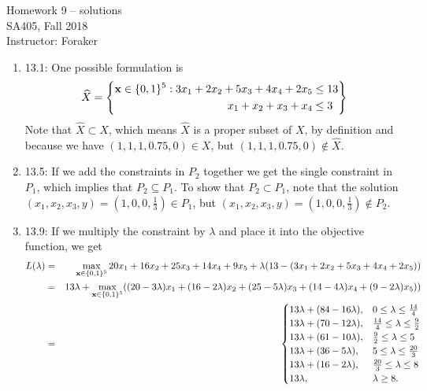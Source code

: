 \documentclass[10pt]{article}
\begin{document}
\begin{center}
  {\sc Homework 9 -- solutions}\\
  {\sc SA405, Fall 2018} \\
  {\sc Instructor: Foraker}
\end{center}

\medskip

\begin{enumerate} 
\item 13.1: One possible formulation is
\begin{equation}
\hat{X} = \left\{ 
\begin{aligned}
\bold{x} \in \{0,1\}^5:  3x_1+2x_2+5x_3+4x_4+2x_5 &\le 13 \\
x_1+x_2+x_3+x_4 &\le 3 \end{aligned} \right\} \nonumber
\end{equation}
Note that $\hat{X} \subset X$, which means $\hat{X}$ is a proper subset of $X$, by definition and because we have $(1,1,1,0.75,0) \in X$, but $(1,1,1,0.75,0) \notin \hat{X}$.

\item 13.5: If we add the constraints in $P_2$ together we get the single constraint in $P_1$, which implies that $P_2 \subseteq P_1$.  To show that $P_2 \subset P_1$, note that the solution $(x_1, x_2, x_3, y) = (1,0,0,\frac{1}{3}) \in P_1$, but $(x_1, x_2, x_3, y) = (1,0,0,\frac{1}{3}) \notin P_2$.

\item 13.9: If we multiply the constraint by $\lambda$ and place it into the objective function, we get
\begin{eqnarray}
L(\lambda) &=& \max_{\bold{x}\in\{0,1\}^5} 20x_1+16x_2+25x_3+14x_4+9x_5+\lambda (13-(3x_1+2x_2+5x_3+4x_4+2x_5)) \nonumber \\
&=& 13 \lambda +  \max_{\bold{x}\in\{0,1\}^5} ((20-3\lambda)x_1+(16-2\lambda)x_2+(25-5\lambda)x_3+(14-4\lambda)x_4+(9-2\lambda)x_5)) \nonumber \\
&=&  \begin{cases} 13\lambda + (84-16\lambda), & 0\le \lambda \le \frac{14}{4} \\ 13\lambda + (70-12\lambda), & \frac{14}{4}\le \lambda \le \frac{9}{2} \\ 13\lambda + (61-10\lambda), & \frac{9}{2}\le \lambda \le 5 \\ 13\lambda + (36-5\lambda), & 5\le \lambda \le \frac{20}{3} \\ 13\lambda + (16-2\lambda), & \frac{20}{3}\le \lambda \le 8 \\ 13\lambda, & \lambda \ge 8. \end{cases} \nonumber
\end{eqnarray}


\end{enumerate}
\end{document}
